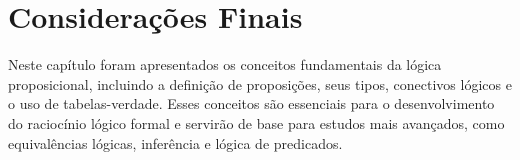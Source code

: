 \section{Considerações Finais}

Neste capítulo foram apresentados os conceitos fundamentais da lógica proposicional, incluindo a definição de proposições, seus tipos, conectivos lógicos e o uso de tabelas-verdade. Esses conceitos são essenciais para o desenvolvimento do raciocínio lógico formal e servirão de base para estudos mais avançados, como equivalências lógicas, inferência e lógica de predicados.